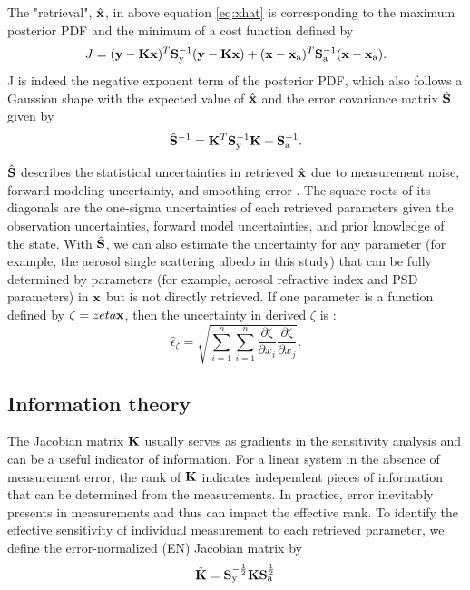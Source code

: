 The "retrieval", $\hat{\mathbf{x}}$, in above equation \eqref{eq:xhat}
is corresponding to the maximum posterior
PDF and the minimum of a cost function defined by
\begin{equation}
J = (\mathbf{y}-\mathbf{K}\mathbf{x})^T\mathbf{S}_\text{y}^{-1}(\mathbf{y}-\mathbf{K}\mathbf{x}) +
    (\mathbf{x}-\mathbf{x}_\text{a})^T\mathbf{S}_\text{a}^{-1}(\mathbf{x}-\mathbf{x}_\text{a}).
\label{eq:cost2}
\end{equation} 
J is indeed the negative exponent term of the posterior PDF, which also
follows a Gaussion shape with the expected value of $\hat{\mathbf{x}}$ and
the error covariance matrix $\hat{\mathbf{S}}$ given by
\begin{equation}
\hat{\mathbf{S}}^{-1} = \mathbf{K}^T\mathbf{S}_\text{y}^{-1}\mathbf{K}+\mathbf{S}_\text{a}^{-1}. \label{eq:shat}
\end{equation}

$\hat{\mathbf{S}}$ describes the statistical uncertainties in retrieved
$\hat{\mathbf{x}}$ due to measurement noise, forward modeling uncertainty, 
and smoothing error \citep{Rodgers00}. The square roots of its 
diagonals are the one-sigma uncertainties of each retrieved parameters 
given the observation uncertainties, forward model uncertainties, 
and prior knowledge of the state. With $\hat{\mathbf{S}}$, we can also 
estimate the uncertainty for any parameter (for example, the aerosol single 
scattering albedo in this study) that can be fully
determined by parameters (for example, aerosol refractive index and PSD
parameters) in $\mathbf{x}$ but is not directly retrieved. If one
parameter is a function defined by $\zeta=zeta{\mathbf{x}}$, then the 
uncertainty in derived $\zeta$ is \citep{Rodgers00}:
\begin{equation}
\hat{\epsilon}_\zeta =
\sqrt{\sum_{i=1}^n\sum_{i=1}^n
      \frac{\partial\zeta}{\partial{x_i}} 
      \frac{\partial\zeta}{\partial{x_j}}}.\label{eq:zeta}
\end{equation}

\subsection{Information theory} \label{subsec:infotheory}

The Jacobian matrix $\mathbf{K}$ usually serves as gradients in the sensitivity
analysis and can be a useful indicator of information. For a linear
system in the absence of measurement error, the rank of $\mathbf{K}$ indicates
independent pieces of information that can be determined from the
measurements. In practice, error inevitably presents in measurements and
thus can impact the effective rank. To identify the effective
sensitivity of individual measurement to each retrieved parameter, we
define the error-normalized (EN) Jacobian matrix by
\begin{equation}
\tilde{\mathbf{K}} = \mathbf{S}_\text{y}^{-\frac{1}{2}}\mathbf{K}\mathbf{S}_\text{a}^{\frac{1}{2}}
\label{eq:enj}
\end{equation}

